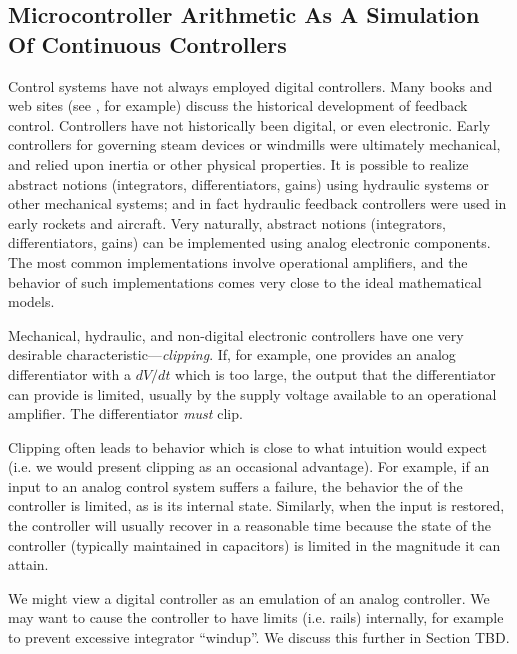\subsection{Microcontroller Arithmetic As A Simulation Of Continuous Controllers}
\label{ccil0:sppm0:smae0}

Control systems have not always employed digital controllers.
Many books and web sites (see \cite{bibref:w:historycontrol01}, for example)
discuss the historical development of feedback control.  Controllers
have not historically been digital, or even electronic.
Early controllers for governing steam devices or windmills were
ultimately mechanical, and relied upon inertia or other physical
properties.  It is possible to realize abstract notions
(integrators, differentiators, gains) using hydraulic systems or other mechanical systems;
and in fact hydraulic feedback controllers were used in early rockets
and aircraft.  Very naturally, abstract notions (integrators,
differentiators, gains) can be implemented using analog
electronic components.  The most common implementations involve
operational amplifiers, and the behavior of such implementations comes
very close to the ideal mathematical models.

Mechanical, hydraulic, and non-digital electronic controllers have
one very desirable characteristic---\emph{clipping}.  If, for example,
one provides an analog differentiator with a $dV/dt$ which
is too large, the output that the differentiator can 
provide is limited, usually by the supply voltage available to an operational
amplifier.
The differentiator \emph{must} clip.

Clipping often leads to behavior which is close to what
intuition would expect (i.e. we would present 
clipping as an occasional advantage).  For example, if an input to
an analog control system suffers a failure, the behavior
the of the controller is limited, as is its internal
state.  Similarly, when the
input is restored, the controller will usually recover 
in a reasonable time because the
state of the controller (typically maintained in capacitors) is limited
in the magnitude it can attain.

We might view a digital controller as an emulation of
an analog controller.  We may want to cause the
controller to have limits (i.e. rails) internally, for
example to prevent excessive integrator ``windup''.  We discuss
this further in Section TBD.



